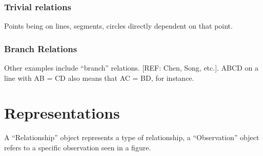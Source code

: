\subsubsection{Trivial relations}

Points being on lines, segments, circles directly dependent on that point.

\subsubsection{Branch Relations}

Other examples include ``branch'' relations. [REF: Chen, Song,
  etc.]. ABCD on a line with AB = CD also means that AC = BD, for instance.

\section{Representations}

A ``Relationship'' object represents a type of relationship, a
``Observation'' object refers to a specific observation seen in a figure.
